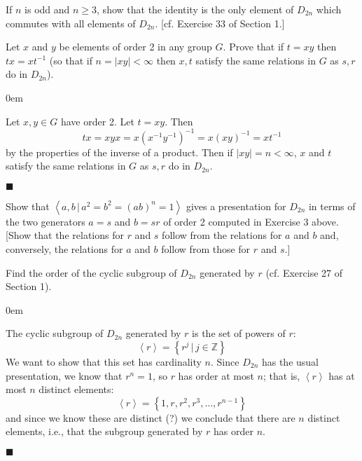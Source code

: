 \documentclass[12pt]{article}
\renewcommand{\qed}{\hfill$\blacksquare$}
\renewenvironment{proof}{\begin{addmargin}[1em]{0em}\begin{newproof}}{\end{newproof}\end{addmargin}\qed}
\newenvironment{problem}[2][Exercise]{\begin{trivlist}
\item[\hskip \labelsep {\bfseries #1}\hskip \labelsep {\bfseries #2.}]}{\end{trivlist}}
\begin{document}
\begin{problem}{1.2.5}
If $n$ is odd and $n\geq 3$, show that the identity is the only element of $D_{2n}$ which commutes with all elements of $D_{2n}$. [cf. Exercise 33 of Section 1.]
\end{problem}

\begin{problem}{1.2.6}
Let $x$ and $y$ be elements of order 2 in any group $G$. Prove that if $t=xy$ then $tx=xt^{-1}$ (so that if $n=\left|xy\right| < \infty$ then $x,t$ satisfy the same relations in $G$ as $s,r$ do in $D_{2n}$).
\end{problem}
\begin{proof}
Let $x,y\in G$ have order 2. Let $t=xy$. Then $$ tx = xyx = x\left(x^{-1}y^{-1}\right)^{-1} = x\left(xy\right)^{-1} = xt^{-1} $$ by the properties of the inverse of a product. Then if $\left|xy\right|=n<\infty$, $x$ and $t$ satisfy the same relations in $G$ as $s,r$ do in $D_{2n}$.
\end{proof}


\begin{problem}{1.2.7}
Show that $\left\langle a,b \, | \, a^2=b^2=\left(ab\right)^n = 1 \right\rangle$ gives a presentation for $D_{2n}$ in terms of the two generators $a=s$ and $b=sr$ of order 2 computed in Exercise 3 above. [Show that the relations for $r$ and $s$ follow from the relations for $a$ and $b$ and, conversely, the relations for $a$ and $b$ follow from those for $r$ and $s$.]
\end{problem}

\begin{problem}{1.2.8}
Find the order of the cyclic subgroup of $D_{2n}$ generated by $r$ (cf. Exercise 27 of Section 1).
\end{problem}
\begin{proof}
The cyclic subgroup of $D_{2n}$ generated by $r$ is the set of powers of $r$:
$$ \left\langle r \right\rangle = \left\{ r^j \, | \, j\in\mathbb{Z}\right\}$$ We want to show that this set has cardinality $n$. Since $D_{2n}$ has the usual presentation, we know that $r^n=1$, so $r$ has order at most $n$; that is, $\left\langle r\right\rangle$ has at most $n$ distinct elements:
$$ \left\langle r\right\rangle = \left\{1,r,r^2,r^3,\ldots,r^{n-1}\right\} $$ and since we know these are distinct (?) we conclude that there are $n$ distinct elements, i.e., that the subgroup generated by $r$ has order $n$.
\end{proof}
\end{document}
